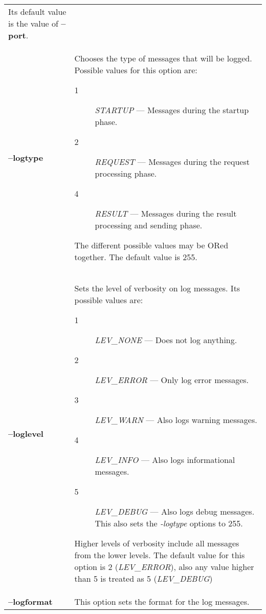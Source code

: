 \documentclass[a4paper]{book}
\begin{document}
\begin{longtable}{lp{2.9in}}
                             Its default value is the value of \textbf{--port}.\\
\textbf{--logtype}         & Chooses the type of messages that will be 
                             logged.  Possible values for this option are:
			                       \begin{description}
			                       \item[1] \emph{STARTUP} --- Messages during
			                         the startup phase.
			                       \item[2] \emph{REQUEST} --- Messages during
			                         the request processing phase.
			                       \item[4] \emph{RESULT} --- Messages during
			                         the result processing and sending phase.
			                       \end{description}
			                       The different possible values may be ORed together.
			                       The default value is 255.\\
\textbf{--loglevel}        & Sets the level of verbosity on log messages.
                             Its possible values are:
			                       \begin{description}
			                       \item[1] \emph{LEV\_NONE} --- Does not log
			                         anything.
			                       \item[2] \emph{LEV\_ERROR} --- Only log
			                         error messages.
			                       \item[3] \emph{LEV\_WARN} --- Also logs
			                         warning messages.
			                       \item[4] \emph{LEV\_INFO} --- Also logs
			                         informational messages.
			                       \item[5] \emph{LEV\_DEBUG} --- Also logs
			                         debug messages. This also sets the
				                       \emph{-logtype} options to 255.
			                       \end{description}
			                       Higher levels of verbosity include all messages
			                       from the lower levels. The default value for this 
			                       option is 2 (\emph{LEV\_ERROR}), also any value 
			                       higher than 5 is treated as 5 (\emph{LEV\_DEBUG})\\
\textbf{--logformat}       & This option sets the format for the log messages.

\end{longtable}
\end{document}
